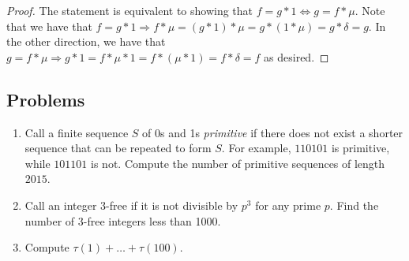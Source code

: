 \documentclass{article}
\theoremstyle{plain}
\numberwithin{equation}{section}
\begin{document}
\begin{proof}
The statement is equivalent to showing that $f = g*1\iff g = f*\mu$. 
Note that we have that $f = g*1\Rightarrow f*\mu = (g * 1)*\mu = g * (1 * \mu) = g*\delta = g$. In the other direction, we have that
$g = f * \mu\Rightarrow g * 1 = f * \mu * 1 = f * (\mu * 1) = f * \delta = f$ as desired.
\end{proof}
\subsection*{Problems}


\begin{enumerate}
\item Call a finite sequence $S$ of 0s and 1s \textit{primitive} if there does not exist a shorter sequence that can be repeated to 
form $S$. For example, $110101$ is primitive, while $101101$ is not. Compute the number of primitive sequences of length $2015$.
\item Call an integer $3$-free if it is not divisible by $p^3$ for any prime $p$. Find the number of $3$-free integers less than 1000.
\item Compute $\tau(1) + \dots + \tau(100)$.

\end{enumerate}
\end{document}
